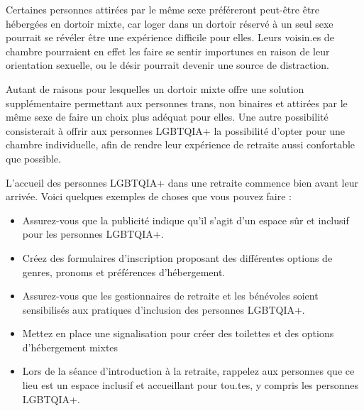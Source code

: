 \documentclass[12pt,openany]{book}
\begin{document}
Certaines personnes attirées par le même sexe préféreront peut-être être hébergées en dortoir mixte, car loger dans un dortoir réservé à un seul sexe pourrait se révéler être une expérience difficile pour elles. Leurs voisin.es de chambre pourraient en effet les faire se sentir importunes en raison de leur orientation sexuelle, ou le désir pourrait devenir une source de distraction.

Autant de raisons pour lesquelles un dortoir mixte offre une solution supplémentaire permettant aux personnes trans, non binaires et attirées par le même sexe de faire un choix plus adéquat pour elles. Une autre possibilité consisterait à offrir aux personnes \mbox{LGBTQIA+} la possibilité d’opter pour une chambre individuelle, afin de rendre leur expérience de retraite aussi confortable que possible.

L’accueil des personnes \mbox{LGBTQIA+} dans une retraite commence bien avant leur arrivée. Voici quelques exemples de choses que vous pouvez faire :

\begin{itemize}[label=\textbullet]
  \setlength\itemsep{-0.3em}
  \item Assurez-vous que la publicité indique qu’il s’agit d’un espace sûr et inclusif pour les personnes \mbox{LGBTQIA+}.
  \item Créez des formulaires d’inscription proposant des différentes options de genres, pronoms et préférences d’hébergement.
  \item Assurez-vous que les gestionnaires de retraite et les bénévoles soient sensibilisés aux pratiques d’inclusion des personnes \mbox{LGBTQIA+}.
  \item Mettez en place une signalisation pour créer des toilettes et des options d’hébergement mixtes
  \item Lors de la séance d’introduction à la retraite, rappelez aux personnes que ce lieu est un espace inclusif et accueillant pour tou.tes, y compris les personnes \mbox{LGBTQIA+}.
\end{itemize}

\bigskip
\bigskip

\begin{figure}[h]
    \centering
\end{figure}
\end{document}
